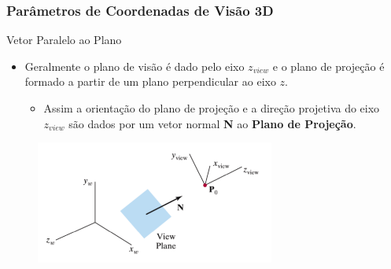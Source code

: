 \documentclass{beamer}
\begin{document}
\begin{frame}
\frametitle{Parâmetros de Coordenadas de Visão 3D}
	\begin{block}{Vetor Paralelo ao Plano}
		\begin{itemize}
			\item Geralmente o plano de visão é dado pelo eixo $z_{view}$ e o plano de projeção é formado a partir de um plano perpendicular ao eixo $z$.
			\begin{itemize}
				\item Assim a orientação do plano de projeção e a direção projetiva do eixo $z_{view}$ são dados por um vetor normal \textbf{N} ao \textbf{Plano de Projeção}. 
			\end{itemize}
		\end{itemize}
	\end{block}
	
	\begin{figure}[!h]
			\begin{center}
			\includegraphics[width=0.7\textwidth]{Figures/PlaVie}
			\end{center}
	\end{figure}
\end{frame}
\end{document}
